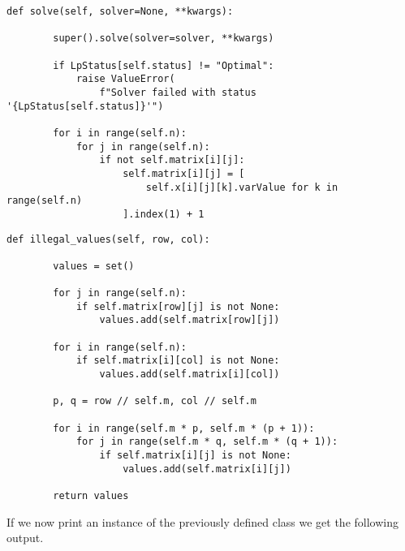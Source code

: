 \documentclass[12pt]{article}
\begin{document}
\begin{lstlisting}[caption={Calling the LpProblem solve method and reflecting the result on the two-dimensional array "matrix"}]
    def solve(self, solver=None, **kwargs):

        super().solve(solver=solver, **kwargs)

        if LpStatus[self.status] != "Optimal":
            raise ValueError(
                f"Solver failed with status '{LpStatus[self.status]}'")

        for i in range(self.n):
            for j in range(self.n):
                if not self.matrix[i][j]:
                    self.matrix[i][j] = [
                        self.x[i][j][k].varValue for k in range(self.n)
                    ].index(1) + 1
\end{lstlisting}

\pagebreak

\begin{lstlisting}[caption={Checking for invalid candidate values before even calling LpProblem.solve}]
    def illegal_values(self, row, col):

        values = set()

        for j in range(self.n):
            if self.matrix[row][j] is not None:
                values.add(self.matrix[row][j])

        for i in range(self.n):
            if self.matrix[i][col] is not None:
                values.add(self.matrix[i][col])

        p, q = row // self.m, col // self.m

        for i in range(self.m * p, self.m * (p + 1)):
            for j in range(self.m * q, self.m * (q + 1)):
                if self.matrix[i][j] is not None:
                    values.add(self.matrix[i][j])

        return values
\end{lstlisting}

\pagebreak

If we now print an instance of the previously defined class
we get the following output. \\
\end{document}
